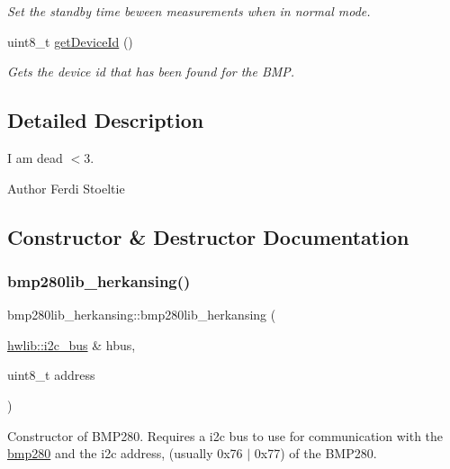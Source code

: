 \begin{DoxyCompactItemize}
\begin{DoxyCompactList}\small\item\em Set the standby time beween measurements when in normal mode. \end{DoxyCompactList}\item 
uint8\+\_\+t \mbox{\hyperlink{classbmp280lib__herkansing_aef18583b72fd106287ab46f37a4d293c}{get\+Device\+Id}} ()
\begin{DoxyCompactList}\small\item\em Gets the device id that has been found for the B\+MP. \end{DoxyCompactList}\end{DoxyCompactItemize}


\subsection{Detailed Description}
I am dead $<$3. 

\begin{DoxyAuthor}{Author}
Ferdi Stoeltie 
\end{DoxyAuthor}


\subsection{Constructor \& Destructor Documentation}
\mbox{\label{classbmp280lib__herkansing_a3cc4f7a6f0d825cfc58cd88fc9db173b}} 
\subsubsection{\texorpdfstring{bmp280lib\_herkansing()}{bmp280lib\_herkansing()}}
{\footnotesize\ttfamily bmp280lib\+\_\+herkansing\+::bmp280lib\+\_\+herkansing (\begin{DoxyParamCaption}\item[{\mbox{\hyperlink{classhwlib_1_1i2c__bus}{hwlib\+::i2c\+\_\+bus}} \&}]{hbus,  }\item[{uint8\+\_\+t}]{address }\end{DoxyParamCaption})}



Constructor of B\+M\+P280. Requires a i2c bus to use for communication with the \mbox{\hyperlink{classbmp280}{bmp280}} and the i2c address, (usually 0x76 $\vert$ 0x77) of the B\+M\+P280. 


